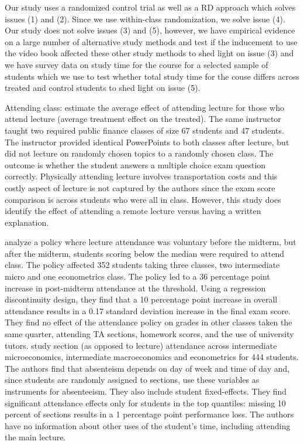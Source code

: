 \documentclass[12pt]{article}
\begin{document}
Our study uses a randomized control trial as well as a RD approach which solves issues (1) and (2).  Since we use within-class randomization, we solve issue (4).  Our study does not solve issues (3) and (5), however, we have empirical evidence on a large number of alternative study methods and test if the inducement to use the video book affected these other study methods to shed light on issue (3) and we have survey data on study time for the course for a selected sample of students which we use to test whether total study time for the couse differs across treated and control students to shed light on issue (5).

Attending class: \textcite{cl2008} estimate the average effect of attending lecture for those who attend lecture (average treatment effect on the treated). The same instructor taught two required public finance classes of size 67 students and 47 students.  The instructor provided identical PowerPoints to both classes after lecture, but did not lecture on randomly chosen topics to a randomly chosen class.  The outcome is whether the student answers a multiple choice exam question correctly.  Physically attending lecture involves transportation costs and this costly aspect of lecture is not captured by the authors since the exam score comparison is across students who were all in class.  However, this study does identify the effect of attending a remote lecture versus having a written explanation.

\textcite{dgm2010} analyze a policy where lecture attendance was voluntary before the midterm, but after the midterm, students scoring below the median were required to attend class. The policy affected 352 students taking three classes, two intermediate micro and one econometrics class. The policy led to a 36 percentage point increase in post-midterm attendance at the threshold. Using a regression discontinuity design, they find that a 10 percentage point increase in overall attendance results in a 0.17 standard deviation increase in the final exam score. They find no effect of the attendance policy on grades in other classes taken the same quarter, attending TA sections, homework scores, and the use of university tutors.
\textcite{ans2012} study section (as opposed to lecture) attendance across intermediate microeconomics, intermediate macroeconomics and econometrics for 444 students. The authors find that absenteism depends on day of week and time of day and, since students are randomly assigned to sections, use these variables as instruments for absenteeism. They also include student fixed-effects. They find significant attendance effects only for students in the top quantiles: missing 10 percent of sections results in a 1 percentage point performance loss. The authors have no information about other uses of the student's time, including attending the main lecture.
\end{document}
